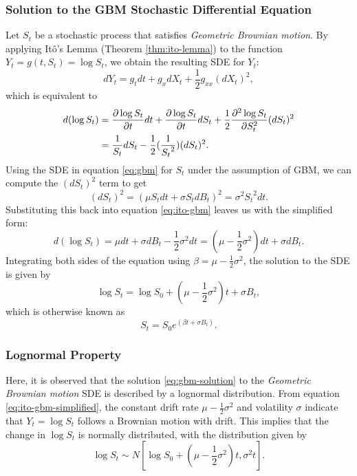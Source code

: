 \subsubsection{Solution to the GBM Stochastic Differential Equation}
Let $S_t$ be a stochastic process that satisfies \textit{Geometric Brownian motion}. By applying It\^{o}'s Lemma (Theorem \ref{thm:ito-lemma}) to the function $ Y_t = g(t, S_t) = \log S_t$, we obtain the resulting SDE for $Y_t$:
\begin{equation}
    dY_t = g_t dt + g_x dX_t + \frac{1}{2} g_{xx} (dX_t)^2,
\end{equation}
which is equivalent to
\begin{align}
    d(\log S_t) 
    {}={}& \frac{\partial \log S_t}{\partial t} dt + \frac{\partial \log S_t}{\partial t} dS_t + \frac{1}{2} \frac{\partial^2 \log S_t}{\partial S_t^2} (dS_t)^2 \notag\\
    {}={}& \frac{1}{S_t} dS_t - \frac{1}{2} (\frac{1}{{S_t}^2}) (dS_t)^2. \label{eq:ito-gbm}
\end{align}
Using the SDE in equation \eqref{eq:gbm} for $S_t$ under the assumption of GBM, we can compute the $(dS_t)^2$ term to get
\begin{equation}
    (dS_t)^2 = (\mu S_t dt + \sigma S_t dB_t)^2 = \sigma ^2 {S_t}^2 dt.
\end{equation}
Substituting this back into equation \eqref{eq:ito-gbm} leaves us with the simplified form:
\begin{equation}
    d(\log S_t) = \mu dt + \sigma dB_t - \frac{1}{2} \sigma^2 dt = (\mu - \frac{1}{2} \sigma^2) dt + \sigma dB_t. \label{eq:ito-gbm-simplified}
\end{equation}
Integrating both sides of the equation using $\beta = \mu - \frac{1}{2} \sigma^2$, the solution to the SDE is given by
\begin{equation}
    \log S_t = \log S_0 + (\mu - \frac{1}{2} \sigma^2) t + \sigma B_t, \label{eq:log-gbm}
\end{equation}
which is otherwise known as
\begin{equation}
    S_t = S_0 e^{(\beta t + \sigma B_t)}. \label{eq:gbm-solution}
\end{equation}

\subsubsection{Lognormal Property}
Here, it is observed that the solution \eqref{eq:gbm-solution} to the \textit{Geometric Brownian motion} SDE is described by a lognormal distribution. From equation \eqref{eq:ito-gbm-simplified}, 
the constant drift rate $\mu - \frac{1}{2} \sigma^2$ and volatility $\sigma$ indicate that $Y_t = \log S_t$ follows a Brownian motion with drift. This implies that the change in $\log S_t$ is normally distributed, with the distribution given by
\begin{equation}
    \log S_t \sim N[ \log S_0 + (\mu - \frac{1}{2} \sigma^2)t, \sigma^2 t].
\end{equation}

